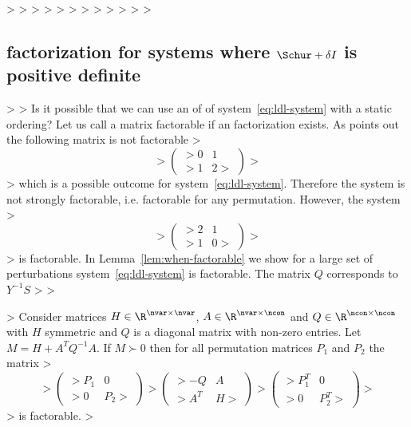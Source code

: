 > 
> 
> 
> 
> 
> 
> 
> 
> 
> \if{}
> 
> \subsection{\LDL{} factorization for systems where $\Schur + \delta I$ is positive definite}
> 
> Is it possible that we can use an of \LDL{} of system~\eqref{eq:ldl-system} with a static ordering? Let us call a matrix factorable if an \LDL{} factorization exists. As \citet{vanderbei1995symmetric} points out the following matrix is not factorable
> $$
> \left( \begin{matrix}
> 0 & 1 \\
> 1 & 2
> \end{matrix} \right)
> $$
> which is a possible outcome for system~\eqref{eq:ldl-system}. Therefore the system is not strongly factorable, i.e. factorable for any permutation. However, the system 
> $$
> \left( \begin{matrix}
> 2 & 1 \\
> 1 & 0
> \end{matrix} \right)
> $$
> is factorable. In Lemma~\ref{lem:when-factorable} we show for a large set of perturbations system~\eqref{eq:ldl-system} is factorable. The matrix $Q$ corresponds to $Y^{-1} S$
> 
> \begin{lemma}\label{lem:when-factorable}
> Consider matrices $H  \in \R^{\nvar \times \nvar}$, $A \in \R^{\nvar \times \ncon}$ and $Q \in \R^{\ncon \times \ncon}$ with $H$ symmetric and $Q$ is a diagonal matrix with non-zero entries. Let $M = H + A^T Q^{-1} A$. If $M \succ 0$ then for all permutation matrices $P_{1}$ and $P_{2}$ the matrix
> $$
> \left( \begin{matrix}
> P_{1} & 0 \\
> 0 & P_{2}
> \end{matrix} \right)
> \left( \begin{matrix}
> -Q & A  \\
> A^T & H
> \end{matrix} \right)
> \left( \begin{matrix}
> P_{1}^T & 0 \\
> 0 & P_{2}^T
> \end{matrix} \right)
> $$
> is factorable.
> \end{lemma}
